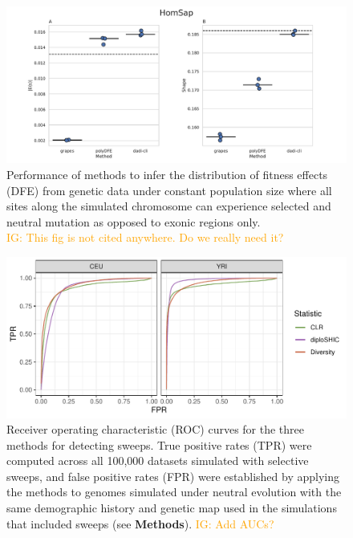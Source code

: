 \documentclass[hidelinks]{article}
\newcommand{\igcomment}[1]{\textcolor{orange}{IG: #1}}
\begin{document}
\begin{figure}[h]
    \centering
    \includegraphics[width=\textwidth]{figures/HomSap/Constant/HomSap_Constant_Gamma_K17_all_sites_DFE_plot}
    \caption{
    \label{fig:homsap-dfe.constant.all_sites}
    Performance of methods to infer the distribution of fitness effects (DFE) from genetic data
    under constant population size  where all sites along the simulated chromosome can experience selected and neutral mutation
    as opposed to exonic regions only.\\
    \igcomment{This fig is not cited anywhere. Do we really need it?}
    }
\end{figure}



\begin{figure}
    \centering
    \includegraphics[width=0.8 \textwidth]{figures/sweeps/roc_neutral_null.pdf}
    \caption{
    \label{fig:roc-curves}
    Receiver operating characteristic (ROC) curves for the three methods for detecting sweeps.
    True positive rates (TPR) were computed across all 100,000 datasets simulated with selective sweeps,
    and false positive rates (FPR) were established by applying the methods to genomes simulated
    under neutral evolution with the same demographic history and genetic map
    used in the simulations that included sweeps (see \textbf{Methods}).
    \igcomment{Add AUCs?}
    }
\end{figure}
\end{document}

